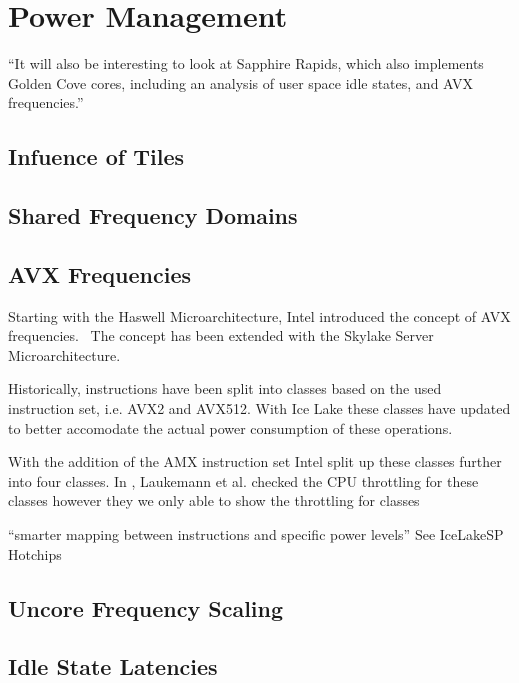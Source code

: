 \chapter{Power Management}
``It will also be interesting to look at Sapphire Rapids, which also implements Golden Cove cores, including an analysis of user space idle states, and AVX frequencies.''

\section{Infuence of Tiles}

\section{Shared Frequency Domains}

\section{AVX Frequencies}

Starting with the Haswell Microarchitecture, Intel introduced the concept of AVX frequencies.~\cite{Hackenberg_2015_Haswell}
The concept has been extended with the Skylake Server Microarchitecture.

Historically, instructions have been split into classes based on the used instruction set, i.e. AVX2 and AVX512.
With Ice Lake these classes have updated to better accomodate the actual power consumption of these operations.

With the addition of the AMX instruction set Intel split up these classes further into four classes. 
In , Laukemann et al. checked the CPU throttling for these classes however they we only able to show the throttling for classes 


``smarter mapping between instructions and specific power levels'' See IceLakeSP Hotchips


\section{Uncore Frequency Scaling}

\section{Idle State Latencies}
